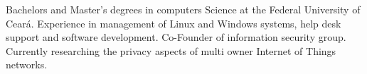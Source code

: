 


Bachelors and Master’s degrees in computers Science at the Federal University of Ceará. Experience in management of Linux and Windows systems, help desk support and software development. Co-Founder of information security group. Currently researching the privacy aspects of multi owner Internet of Things networks.
